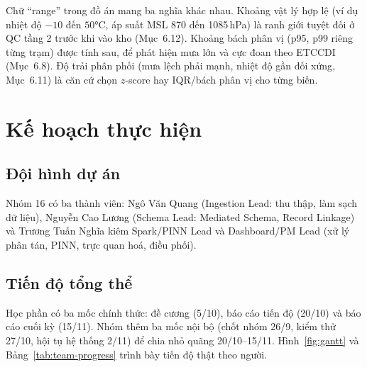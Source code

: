 \documentclass[12pt,a4paper]{report}
\begin{document}
Chữ ``range'' trong đồ án mang ba nghĩa khác nhau. Khoảng vật lý hợp lệ (ví dụ nhiệt độ $-10$ đến
$50°$C, áp suất MSL 870 đến 1085\,hPa) là ranh giới tuyệt đối ở QC tầng 2 trước khi vào kho
(Mục~6.12). Khoảng bách phân vị (p95, p99 riêng từng trạm) được tính sau, để phát hiện mưa lớn và
cực đoan theo ETCCDI (Mục~6.8). Độ trải phân phối (mưa lệch phải mạnh, nhiệt độ gần đối xứng,
Mục~6.11) là căn cứ chọn $z$-score hay IQR/bách phân vị cho từng biến.

\chapter{Kế hoạch thực hiện}

\section{Đội hình dự án}

Nhóm 16 có ba thành viên: Ngô Văn Quang (Ingestion Lead: thu thập, làm sạch dữ liệu), Nguyễn Cao
Lương (Schema Lead: Mediated Schema, Record Linkage) và Trương Tuấn Nghĩa kiêm Spark/PINN Lead và
Dashboard/PM Lead (xử lý phân tán, PINN, trực quan hoá, điều phối).


\section{Tiến độ tổng thể}

Học phần có ba mốc chính thức: đề cương (5/10), báo cáo tiến độ (20/10) và báo cáo cuối kỳ (15/11).
Nhóm thêm ba mốc nội bộ (chốt nhóm 26/9, kiểm thử 27/10, hội tụ hệ thống 2/11) để chia nhỏ quãng
20/10--15/11. Hình~\ref{fig:gantt} và Bảng~\ref{tab:team-progress} trình bày tiến độ thật theo người.
\end{document}

